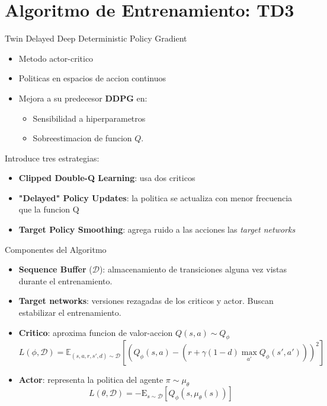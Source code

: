 \section{Algoritmo de Entrenamiento: TD3}

\begin{frame}{Twin Delayed Deep Deterministic Policy Gradient}
    \begin{itemize}
        \item Metodo actor-critico
        \item Politicas en espacios de accion continuos
        \item Mejora a su predecesor \textbf{DDPG} en:
            \begin{itemize}
                \item Sensibilidad a hiperparametros
                \item Sobreestimacion de funcion $Q$.
            \end{itemize}
    \end{itemize}

    Introduce tres estrategias:
    \begin{itemize}
        \item \textbf{Clipped Double-Q Learning}: usa dos criticos
        \item \textbf{"Delayed" Policy Updates}: la politica se actualiza con menor frecuencia que la funcion Q
        \item \textbf{Target Policy Smoothing}: agrega ruido a las acciones las \textit{target networks}
    \end{itemize}
\end{frame}

\begin{frame}{Componentes del Algoritmo}
    \begin{itemize}
        \item \textbf{Sequence Buffer} ($\mathcal{D}$): almacenamiento de transiciones alguna vez vistas durante el entrenamiento.
        \item \textbf{Target networks}: versiones rezagadas de los criticos y actor. Buscan estabilizar el entrenamiento.
        \item \textbf{Critico}: aproxima funcion de valor-accion $Q(s,a) \sim Q_{\phi}$
        \begin{equation}
            L(\phi, \mathcal{D}) = \mathbb{E}_{(s, a, r, s', d) \sim \mathcal{D}} \left[ \left( Q_{\phi}(s,a) - (r + \gamma(1-d) \max_{a'} Q_{\phi}(s', a'))\right)^2 \right]
        \end{equation}
        \item \textbf{Actor}: representa la politica del agente $\pi \sim \mu_{\theta}$
        \begin{equation}
            L(\theta, \mathcal{D}) = -\mathrm{E}_{s \sim \mathcal{D}} \left[ Q_{\phi}(s, \mu_{\theta}(s)) \right]
        \end{equation}
    \end{itemize}
\end{frame}

